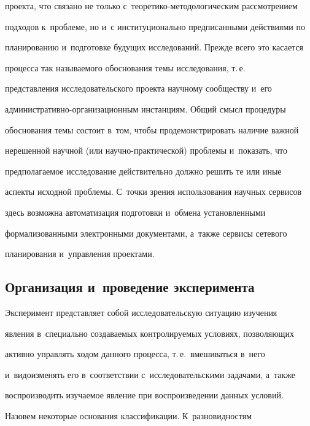 проекта, что связано не только с~тео\-ре\-ти\-ко-ме\-то\-до\-ло\-ги\-че\-ским рассмотрением 

подходов к~проб\-ле\-ме, но и~с институционально предписанными действиями по 

планированию и~подготовке будущих исследований. Прежде всего это касается 

процесса так называемого обоснования темы исследования, т.\,е.\ 

представления исследовательского проекта научному сообществу и~его 

ад\-ми\-нист\-ра\-тив\-но-ор\-га\-ни\-за\-ци\-он\-ным инстанциям. Общий смысл процедуры 

обоснования темы состоит в~том, чтобы продемонстрировать наличие важной 

нерешенной научной (или на\-уч\-но-прак\-ти\-че\-ской) проб\-ле\-мы и~показать, что 

предполагаемое исследование действительно должно решить те или иные 

аспекты исходной проблемы. С~точки зрения использования научных сервисов 

здесь возможна автоматизация подготовки и~обмена установленными 

формализованными электронными документами, а~также сервисы сетевого 

планирования и~управления проектами. 

    



    

    \subsection*{Организация и~проведение эксперимента}

    

    

    Эксперимент представляет собой исследовательскую ситуацию изучения 

явления в~специально создаваемых контролируемых условиях, позволяющих 

активно управлять ходом данного процесса, т.\,е.\ вмешиваться в~него 

и~видоизменять его в~соответствии с~исследовательскими задачами, а~также 

воспроизводить изучаемое явление при воспроизведении данных условий. 

Назовем некоторые основания классификации. К~разновидностям 

